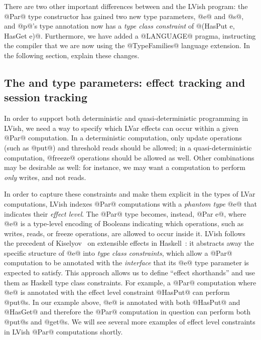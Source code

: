 There are two other important differences between  and the LVish
program: the @Par@ type constructor has gained two new type
parameters, @e@ and @s@, and @p@'s type annotation now has a
\emph{type class constraint} of @(HasPut e, HasGet e)@.  Furthermore,
we have added a @LANGUAGE@ pragma, instructing the compiler that we
are now using the @TypeFamilies@ language extension.  In the following
section,  explain these changes.

\subsection{The  and  type parameters: effect tracking and session tracking}

In order to support both deterministic and quasi-deterministic
programming in LVish, we need a way to specify which LVar effects can
occur within a given @Par@ computation.  In a deterministic
computation, only update operations (such as @put@) and threshold
reads should be allowed; in a quasi-deterministic computation,
@freeze@ operations should be allowed as well.  Other combinations may
be desirable as well: for instance, we may want a computation to
perform \emph{only} writes, and not reads.

In order to capture these constraints and make them explicit in the
types of LVar computations, LVish indexes @Par@ computations with a
\emph{phantom type} @e@ that indicates their \emph{effect level}.  The
@Par@ type becomes, instead, @Par e@, where @e@ is a type-level
encoding of Booleans indicating which operations, such as writes,
reads, or freeze operations, are allowed to occur inside it.  LVish
follows the precedent of Kiselyov \etal~on extensible effects in
Haskell~\cite{oleg-amr-haskell-2013}: it abstracts away the specific
structure of @e@ into \emph{type class constraints}, which allow a
@Par@ computation to be annotated with the \emph{interface} that its
@e@ type parameter is expected to satisfy.  This approach allows us to
define ``effect shorthands'' and use them as Haskell type class
constraints.  For example, a @Par@ computation where @e@ is annotated
with the effect level constraint @HasPut@ can perform @put@s.  In our
example above, @e@ is annotated with both @HasPut@ and @HasGet@ and
therefore the @Par@ computation in question can perform both @put@s
and @get@s.  We will see several more examples of effect level
constraints in LVish @Par@ computations shortly.

